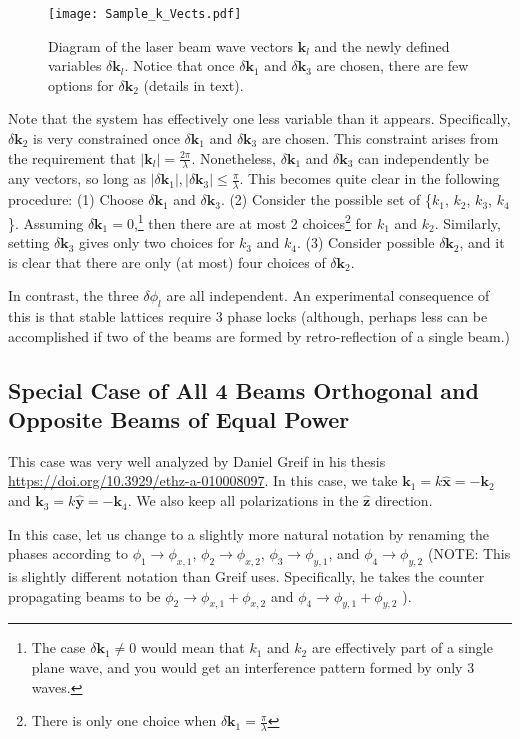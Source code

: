 \documentclass[11pt]{article}
\newcommand{\abs}[1]{\left| #1 \right|}
\newcommand{\rta}{\rightarrow}
\newcommand{\de}{\delta}
\newcommand{\ph}{\phi}
\newcommand{\vk}{\mathbf{k}}
\newcommand{\vxhat}{\mathbf{\hat{x}}}
\newcommand{\vyhat}{\mathbf{\hat{y}}}
\newcommand{\vzhat}{\mathbf{\hat{z}}}
\begin{document}
\begin{figure}[h]
\centering
\texttt{[image: Sample\_k\_Vects.pdf]}
\caption{Diagram of the laser beam wave vectors $\vk_l$ and the newly defined variables $\de\vk_l$.  Notice that once $\de \vk_1$ and $\de \vk_3$ are chosen, there are few options for $\de \vk_2$ (details in text).}
\label{fig:kDiagram}
\end{figure}

Note that the system has effectively one less variable than it appears.  Specifically, $\de \vk_{2}$ is very constrained once $\de \vk_1$ and $\de \vk_3$ are chosen.  This constraint arises from the requirement that $\abs{\vk_l} = \frac{2\pi}{\lambda}$.  Nonetheless, $\de \vk_1$ and $\de \vk_3$ can independently be any vectors, so long as $\abs{\de \vk_1},  \abs{\de \vk_3} \le \frac{\pi}{\lambda}$.  This becomes quite clear in the following procedure: (1) Choose $\de \vk_1$ and $\de \vk_3$.  (2) Consider the possible set of \{$k_1$, $k_2$, $k_3$, $k_4$\}.  Assuming $\de \vk_1 = 0$,\footnote{The case $\de \vk_1 \neq 0$ would mean that $k_1$ and $k_2$ are effectively part of a single plane wave, and you would get an interference pattern formed by only 3 waves.} then there are at most 2 choices\footnote{There is only one choice when $\de \vk_1 = \frac{\pi}{\lambda}$} for $k_1$ and $k_2$.  Similarly, setting $\de \vk_3$ gives only two choices for $k_3$ and $k_4$.  (3)  Consider possible $\de \vk_{2}$, and it is clear that there are only (at most) four choices of $\de \vk_{2}$.

In contrast, the three $\de\ph_l$ are all independent.  An experimental consequence of this is that stable lattices require 3 phase locks (although, perhaps less can be accomplished if two of the beams are formed by retro-reflection of a single beam.)


\subsection{Special Case of All 4 Beams Orthogonal and Opposite Beams of Equal Power}

This case was very well analyzed by Daniel Greif in his thesis \url{https://doi.org/10.3929/ethz-a-010008097}. In this case, we take $\vk_1 = k\vxhat = -\vk_2$ and $\vk_3 = k\vyhat = -\vk_4$.  We also keep all polarizations in the $\vzhat$ direction.

In this case, let us change to a slightly more natural notation by renaming the phases according to $\ph_1 \rta \ph_{x,1}$, $\ph_2 \rta \ph_{x,2}$, $\ph_3 \rta \ph_{y,1}$, and $\ph_4 \rta \ph_{y,2}$ (NOTE: This is slightly different notation than Greif uses.  Specifically, he takes the counter propagating beams to be $\ph_2 \rta \ph_{x,1} + \ph_{x,2}$ and  $\ph_4 \rta \ph_{y,1} + \ph_{y,2}$ ).
\end{document}
